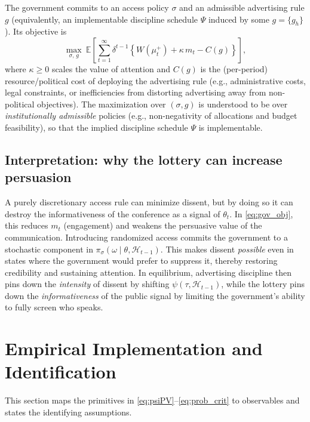 \documentclass[12pt]{article}
\begin{document}
The government commits to an access policy $\sigma$ and an admissible advertising rule $g$ (equivalently, an implementable discipline schedule $\Psi$ induced by some $g=\{g_h\}$). Its objective is
\begin{equation}\label{eq:gov_obj}
\max_{\sigma,\,g}\ 
\mathbb{E}\left[\sum_{t=1}^\infty \delta^{t-1}
\left\{
W(\mu_t^+) + \kappa\, m_t - C(g)
\right\}\right],
\end{equation}
where $\kappa\ge 0$ scales the value of attention and $C(g)$ is the (per-period) resource/political cost of deploying the advertising rule (e.g., administrative costs, legal constraints, or inefficiencies from distorting advertising away from non-political objectives). The maximization over $(\sigma,g)$ is understood to be over \emph{institutionally admissible} policies (e.g., non-negativity of allocations and budget feasibility), so that the implied discipline schedule $\Psi$ is implementable.

\subsection{Interpretation: why the lottery can increase persuasion}

A purely discretionary access rule can minimize dissent, but by doing so it can destroy the informativeness of the conference as a signal of $\theta_t$. In \eqref{eq:gov_obj}, this reduces $m_t$ (engagement) and weakens the persuasive value of the communication. Introducing randomized access commits the government to a stochastic component in $\pi_\sigma(\omega\mid \theta,\mathcal{H}_{t-1})$. This makes dissent \emph{possible} even in states where the government would prefer to suppress it, thereby restoring credibility and sustaining attention. In equilibrium, advertising discipline then pins down the \emph{intensity} of dissent by shifting $\psi(\tau,\mathcal{H}_{t-1})$, while the lottery pins down the \emph{informativeness} of the public signal by limiting the government's ability to fully screen who speaks.

\section{Empirical Implementation and Identification}

This section maps the primitives in \eqref{eq:psiPV}--\eqref{eq:prob_crit} to observables and states the identifying assumptions.
\end{document}

